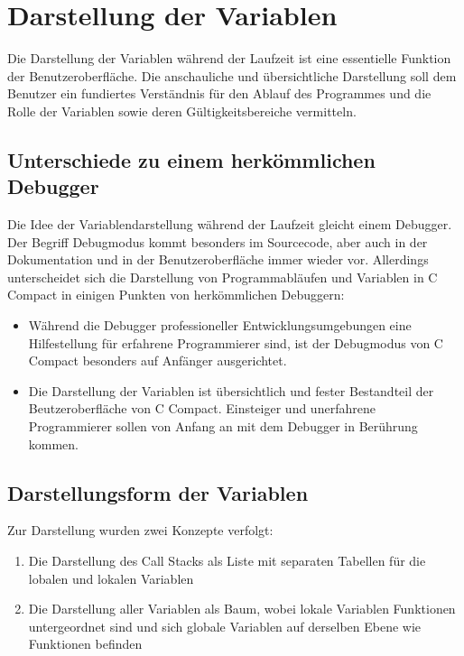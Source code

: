 \chapter{Darstellung der Variablen}

Die Darstellung der Variablen während der Laufzeit ist eine essentielle Funktion der Benutzeroberfläche. Die anschauliche und übersichtliche Darstellung soll dem Benutzer ein fundiertes Verständnis für den Ablauf des Programmes und die Rolle der Variablen sowie deren Gültigkeitsbereiche vermitteln.

\section{Unterschiede zu einem herkömmlichen Debugger}
Die Idee der Variablendarstellung während der Laufzeit gleicht einem Debugger. Der Begriff Debugmodus kommt besonders im Sourcecode, aber auch in der Dokumentation und in der Benutzeroberfläche immer wieder vor. Allerdings unterscheidet sich die Darstellung von Programmabläufen und Variablen in C Compact in einigen Punkten von herkömmlichen Debuggern:
\begin{itemize}
\item Während die Debugger professioneller Entwicklungsumgebungen eine Hilfestellung für erfahrene Programmierer sind, ist der Debugmodus von C Compact besonders auf Anfänger ausgerichtet.
\item Die Darstellung der Variablen ist übersichtlich und fester Bestandteil der Beutzeroberfläche von C Compact. Einsteiger und unerfahrene Programmierer sollen von Anfang an mit dem Debugger in Berührung kommen.
\end{itemize}

\section{Darstellungsform der Variablen}

Zur Darstellung wurden zwei Konzepte verfolgt:
\begin{enumerate}
\item Die Darstellung des Call Stacks als Liste mit separaten Tabellen für die lobalen und lokalen Variablen
\item Die Darstellung aller Variablen als Baum, wobei lokale Variablen Funktionen untergeordnet sind und sich globale Variablen auf derselben Ebene wie Funktionen befinden
\end{enumerate}

